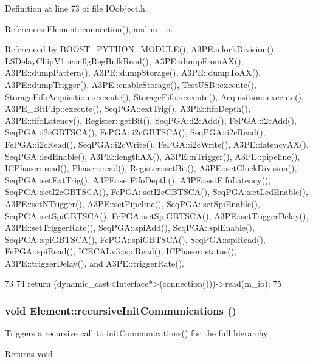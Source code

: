 Definition at line 73 of file IOobject.h.

References Element::connection(), and m\_\-io.

Referenced by BOOST\_\-PYTHON\_\-MODULE(), A3PE::clockDivision(), LSDelayChipV1::configRegBulkRead(), A3PE::dumpFromAX(), A3PE::dumpPattern(), A3PE::dumpStorage(), A3PE::dumpToAX(), A3PE::dumpTrigger(), A3PE::enableStorage(), TestUSB::execute(), StorageFifoAcquisition::execute(), StorageFifo::execute(), Acquisition::execute(), A3PE\_\-BitFlip::execute(), SeqPGA::extTrig(), A3PE::fifoDepth(), A3PE::fifoLatency(), Register::getBit(), SeqPGA::i2cAdd(), FePGA::i2cAdd(), SeqPGA::i2cGBTSCA(), FePGA::i2cGBTSCA(), SeqPGA::i2cRead(), FePGA::i2cRead(), SeqPGA::i2cWrite(), FePGA::i2cWrite(), A3PE::latencyAX(), SeqPGA::ledEnable(), A3PE::lengthAX(), A3PE::nTrigger(), A3PE::pipeline(), ICPhaser::read(), Phaser::read(), Register::setBit(), A3PE::setClockDivision(), SeqPGA::setExtTrig(), A3PE::setFifoDepth(), A3PE::setFifoLatency(), SeqPGA::setI2cGBTSCA(), FePGA::setI2cGBTSCA(), SeqPGA::setLedEnable(), A3PE::setNTrigger(), A3PE::setPipeline(), SeqPGA::setSpiEnable(), SeqPGA::setSpiGBTSCA(), FePGA::setSpiGBTSCA(), A3PE::setTriggerDelay(), A3PE::setTriggerRate(), SeqPGA::spiAdd(), SeqPGA::spiEnable(), SeqPGA::spiGBTSCA(), FePGA::spiGBTSCA(), SeqPGA::spiRead(), FePGA::spiRead(), ICECALv3::spiRead(), ICPhaser::status(), A3PE::triggerDelay(), and A3PE::triggerRate().


\begin{DoxyCode}
73                            {
74     return (dynamic_cast<Interface*>(connection()))->read(m_io);
75   }
\end{DoxyCode}
\hypertarget{classElement_a82119ed37dff76508a2746a853ec35ba}{
\subsubsection[{recursiveInitCommunications}]{\setlength{\rightskip}{0pt plus 5cm}void Element::recursiveInitCommunications ()}}
\label{classElement_a82119ed37dff76508a2746a853ec35ba}
Triggers a recursive call to initCommunications() for the full hierarchy

\begin{DoxyReturn}{Returns}
void 
\end{DoxyReturn}


